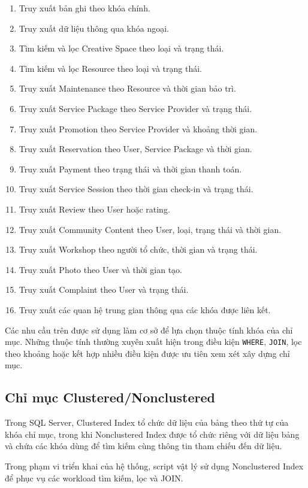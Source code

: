 \begin{enumerate}
	\item Truy xuất bản ghi theo khóa chính.
	\item Truy xuất dữ liệu thông qua khóa ngoại.
	\item Tìm kiếm và lọc Creative Space theo loại và trạng thái.
	\item Tìm kiếm và lọc Resource theo loại và trạng thái.
	\item Truy xuất Maintenance theo Resource và thời gian bảo trì.
	\item Truy xuất Service Package theo Service Provider và trạng thái.
	\item Truy xuất Promotion theo Service Provider và khoảng thời gian.
	\item Truy xuất Reservation theo User, Service Package và thời gian.
	\item Truy xuất Payment theo trạng thái và thời gian thanh toán.
	\item Truy xuất Service Session theo thời gian check-in và trạng thái.
	\item Truy xuất Review theo User hoặc rating.
	\item Truy xuất Community Content theo User, loại, trạng thái và thời gian.
	\item Truy xuất Workshop theo người tổ chức, thời gian và trạng thái.
	\item Truy xuất Photo theo User và thời gian tạo.
	\item Truy xuất Complaint theo User và trạng thái.
	\item Truy xuất các quan hệ trung gian thông qua các khóa được liên kết.
\end{enumerate}

Các nhu cầu trên được sử dụng làm cơ sở để lựa chọn thuộc tính khóa của
chỉ mục. Những thuộc tính thường xuyên xuất hiện trong điều kiện
\texttt{WHERE}, \texttt{JOIN}, lọc theo khoảng hoặc kết hợp nhiều điều kiện
được ưu tiên xem xét xây dựng chỉ mục.

\subsection{Chỉ mục Clustered/Nonclustered}

Trong SQL Server, Clustered Index tổ chức dữ liệu của bảng theo thứ tự của
khóa chỉ mục, trong khi Nonclustered Index được tổ chức riêng với dữ liệu
bảng và chứa các khóa dùng để tìm kiếm cùng thông tin tham chiếu đến dữ liệu.

Trong phạm vi triển khai của hệ thống, script vật lý sử dụng Nonclustered
Index để phục vụ các workload tìm kiếm, lọc và JOIN.

